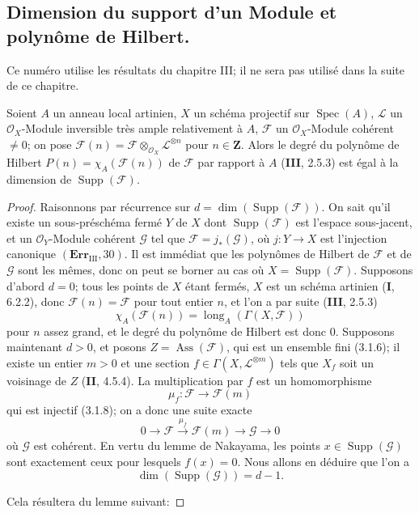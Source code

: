 
\subsection{Dimension du support d'un Module et polynôme de Hilbert.}
\label{IV.2.s5.3-fr}

Ce numéro utilise les résultats du chapitre III; il ne sera pas utilisé dans la
suite de ce chapitre.

\begin{proposition}[5.3.1]
\label{IV.2.s5.3.1-fr}
Soient $A$ un anneau local artinien, $X$ un schéma projectif sur
$\operatorname{Spec}(A)$, $\mathcal L$ un $\mathcal O_X$-Module inversible
très ample relativement à $A$, $\mathcal F$ un $\mathcal O_X$-Module cohérent
$\ne0$; on pose
$\mathcal F(n)=\mathcal F\otimes_{\mathcal O_X}\mathcal L^{\otimes n}$ pour
$n\in\mathbf Z$. Alors le degré du polynôme de Hilbert
$P(n)=\chi_A(\mathcal F(n))$ de $\mathcal F$ par rapport à $A$ \textup{(\textbf{III}, 2.5.3)}
est égal à la dimension de $\operatorname{Supp}(\mathcal F)$.
\end{proposition}

\begin{proof}
Raisonnons par récurrence sur
$d=\dim(\operatorname{Supp}(\mathcal F))$. On sait qu'il existe un
sous-préschéma fermé $Y$ de $X$ dont $\operatorname{Supp}(\mathcal F)$ est
l'espace sous-jacent, et un $\mathcal O_Y$-Module cohérent $\mathcal G$ tel
que $\mathcal F=j_*(\mathcal G)$, où $j:Y\to X$ est l'injection canonique
$(\mathbf{Err}_{\mathrm{III}},30)$. Il est immédiat que les polynômes de
Hilbert de $\mathcal F$ et de $\mathcal G$ sont les mêmes, donc on peut se
borner au cas où $X=\operatorname{Supp}(\mathcal F)$. Supposons d'abord
$d=0$; tous les points de $X$ étant fermés, $X$ est un schéma artinien
(\textbf{I}, 6.2.2), donc $\mathcal F(n)=\mathcal F$ pour tout entier $n$, et l'on a
par suite (\textbf{III}, 2.5.3)
\[
\chi_A(\mathcal F(n))=\operatorname{long}_A(\Gamma(X,\mathcal F))
\]
pour $n$ assez grand, et le degré du polynôme de Hilbert est donc $0$.
Supposons maintenant $d>0$, et posons
$Z=\operatorname{Ass}(\mathcal F)$, qui est un ensemble fini (3.1.6); il
existe un entier $m>0$ et une section
$f\in\Gamma(X,\mathcal L^{\otimes m})$ tels que $X_f$ soit un voisinage de
$Z$ (\textbf{II}, 4.5.4). La multiplication par $f$ est un homomorphisme
\[
\mu_f:\mathcal F\longrightarrow\mathcal F(m)
\]
qui est injectif (3.1.8); on a donc une suite exacte
\begin{equation}
0\longrightarrow\mathcal F\xrightarrow{\mu_f}\mathcal F(m)
\longrightarrow\mathcal G\longrightarrow0
\tag{5.3.1.1}\label{IV.2.s5.3.1.1-fr}
\end{equation}
où $\mathcal G$ est cohérent. En vertu du lemme de Nakayama, les points
$x\in\operatorname{Supp}(\mathcal G)$ sont exactement ceux pour lesquels
$f(x)=0$. Nous allons en déduire que l'on a
\begin{equation}
\dim(\operatorname{Supp}(\mathcal G))=d-1.
\tag{5.3.1.2}\label{IV.2.s5.3.1.2-fr}
\end{equation}

Cela résultera du lemme suivant:
\end{proof}

